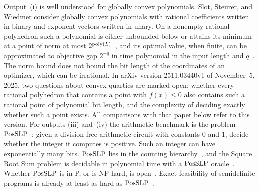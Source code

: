 Output~(i) is well understood for globally convex polynomials. Slot,
Steurer, and Wiedmer consider globally convex polynomials with rational
coefficients written in binary and exponent vectors written in unary. On a
nonempty rational polyhedron such a polynomial is either unbounded below or attains
its minimum at a point of norm at most
$2^{\operatorname{poly}(L)}$~\cite[Theorem~1.1]{SlotSteurerWiedmer2025}, and its optimal
value, when finite, can be approximated to objective gap $2^{-q}$ in time
polynomial in the input length and $q$~\cite[Corollary~1.2]{SlotSteurerWiedmer2025}. The norm bound does not
bound the bit length of the coordinates of an optimizer, which can be
irrational. In arXiv version 2511.03440v1 of November~5, 2025, two questions
about convex quartics are marked open: whether every rational polyhedron that
contains a point with $f(x)\le0$ also contains such a rational point of
polynomial bit length, and the complexity of deciding exactly whether such a
point exists. All comparisons with that paper below refer to this version.
For outputs (iii) and~(iv) the arithmetic benchmark is the
problem $\mathrm{PosSLP}$~\cite{AllenderEtAl2009}: given a division-free arithmetic
circuit with constants $0$ and $1$, decide whether the integer it computes is
positive. Such an integer can have exponentially many bits. $\mathrm{PosSLP}$ lies in
the counting hierarchy~\cite[Theorem~1.4]{AllenderEtAl2009}, and the Square
Root Sum problem is decidable in polynomial time with a $\mathrm{PosSLP}$
oracle~\cite[Section~1.4]{AllenderEtAl2009}. Whether $\mathrm{PosSLP}$ is in P, or is
NP-hard, is open~\cite{BuergisserJindal2024}. Exact feasibility of
semidefinite programs is already at least as hard as
$\mathrm{PosSLP}$~\cite{TarasovVyalyi2008}.

